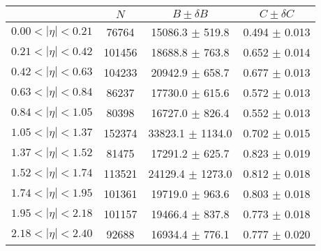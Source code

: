 \begin{tabular}{lccc}
\hline
    &   $N$   & $B \pm \delta B$  &  $C \pm \delta C$ \\
\hline
$0.00 < |\eta| <0.21$          & 76764      & 15086.3    $\pm$ 519.8 & 0.494      $\pm$ 0.013 \\
$0.21 < |\eta| <0.42$          & 101456     & 18688.8    $\pm$ 763.8 & 0.652      $\pm$ 0.014 \\
$0.42 < |\eta| <0.63$          & 104233     & 20942.9    $\pm$ 658.7 & 0.677      $\pm$ 0.013 \\
$0.63 < |\eta| <0.84$          & 86237      & 17730.0    $\pm$ 615.6 & 0.572      $\pm$ 0.013 \\
$0.84 < |\eta| <1.05$          & 80398      & 16727.0    $\pm$ 826.4 & 0.552      $\pm$ 0.013 \\
$1.05 < |\eta| <1.37$          & 152374     & 33823.1    $\pm$ 1134.0 & 0.702      $\pm$ 0.015 \\
$1.37 < |\eta| <1.52$          & 81475      & 17291.2    $\pm$ 625.7 & 0.823      $\pm$ 0.019 \\
$1.52 < |\eta| <1.74$          & 113521     & 24129.4    $\pm$ 1273.0 & 0.812      $\pm$ 0.018 \\
$1.74 < |\eta| <1.95$          & 101361     & 19719.0    $\pm$ 963.6 & 0.803      $\pm$ 0.018 \\
$1.95 < |\eta| <2.18$          & 101157     & 19466.4    $\pm$ 837.8 & 0.773      $\pm$ 0.018 \\
$2.18 < |\eta| <2.40$          & 92688      & 16934.4    $\pm$ 776.1 & 0.777      $\pm$ 0.020 \\
\hline
\end{tabular}
